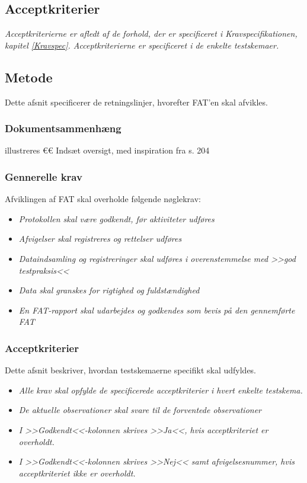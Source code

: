 		\subsection{Acceptkriterier}
		\textit{Acceptkriterierne er afledt af de forhold, der er specificeret i Kravspecifikationen, kapitel \ref{Kravspec}. Acceptkriterierne er specificeret i de enkelte testskemaer.} 
		
		\subsection{Metode}
		Dette afsnit specificerer de retningslinjer, hvorefter FAT'en skal afvikles. 
		
			\subsubsection{Dokumentsammenhæng}
			illustreres 
			€€ Indsæt oversigt, med inspiration fra s. 204 	
			
			\subsubsection{Gennerelle krav}
			Afviklingen af FAT skal overholde følgende nøglekrav: 
			
			\begin{itemize}
				\item \textit{Protokollen skal være godkendt, før aktiviteter udføres}
				\item \textit{Afvigelser skal registreres og rettelser udføres}
				\item \textit{Dataindsamling og registreringer skal udføres i overenstemmelse med >>god testpraksis<< }
				\item \textit{Data skal granskes for rigtighed og fuldstændighed }
				\item \textit{En FAT-rapport skal udarbejdes og godkendes som bevis på den gennemførte FAT}
			\end{itemize}
			
			\subsubsection{Acceptkriterier}
			 Dette afsnit beskriver, hvordan testskemaerne specifikt skal udfyldes. 
			 
			 \begin{itemize}
				\item \textit{Alle krav skal opfylde de specificerede acceptkriterier i hvert enkelte testskema.}
				\item \textit{De aktuelle observationer skal svare til de forventede observationer}
				\item \textit{I >>Godkendt<<-kolonnen skrives >>Ja<<, hvis acceptkriteriet er overholdt.} 
				\item \textit{I >>Godkendt<<-kolonnen skrives >>Nej<< samt afvigelsesnummer, hvis acceptkriteriet ikke er overholdt.}  
			\end{itemize}
			
